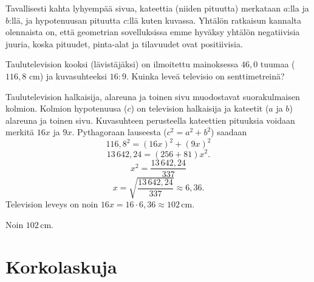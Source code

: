 Tavallisesti kahta lyhyempää sivua, kateettia (niiden pituutta) merkataan $a$:lla ja $b$:llä, ja hypotenuusan pituutta $c$:llä kuten kuvassa. Yhtälön ratkaisun kannalta olennaista on, että geometrian sovelluksissa emme hyväksy yhtälön negatiivisia juuria, koska pituudet, pinta-alat ja tilavuudet ovat positiivisia.

\begin{esimerkki}
Taulutelevision kooksi (lävistäjäksi) on ilmoitettu mainoksessa $46,0$ tuumaa ($116,8$ cm) ja kuvasuhteeksi $16:9$. Kuinka leveä televisio on senttimetreinä?


\begin{esimratk}
Taulutelevision halkaisija, alareuna ja toinen sivu muodostavat suorakulmaisen kolmion. Kolmion hypotenuusa ($c$) on television halkaisija ja kateetit ($a$ ja $b$) alareuna ja toinen sivu. Kuvasuhteen perusteella kateettien pituuksia voidaan merkitä $16x$ ja $9x$. Pythagoraan lauseesta ($c^2 = a^2 + b^2$) saadaan
\[
116,8^2 = (16x)^2 + (9x)^2
\]
\[
13\,642,24 = (256+81)x^2.
\]
\[
x^2 = \frac{13\,642,24}{337}
\]
\[
x= \sqrt{\frac{13\,642,24}{337}} \approx 6,36.
\]
Television leveys on noin $16x = 16\cdot 6,36\approx 102$\,cm.
\end{esimratk}

\begin{esimvast}Noin $102$\,cm. \end{esimvast}
\end{esimerkki}

\section*{Korkolaskuja}

